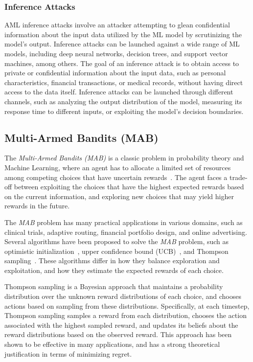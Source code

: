 \subsubsection{Inference Attacks}
AML inference attacks involve an attacker attempting to glean confidential information about the input data utilized
by the ML model by scrutinizing the model's output.
Inference attacks can be launched against a wide range of ML models, including deep neural networks, decision trees,
and support vector machines, among others.
The goal of an inference attack is to obtain access to private or confidential information about the input data, such
as personal characteristics, financial transactions, or medical records, without having direct access to the data itself.
Inference attacks can be launched through different channels, such as analyzing the output distribution of the model,
measuring its response time to different inputs, or exploiting the model's decision boundaries.


\subsection{Multi-Armed Bandits (MAB)}\label{subsec:back-multi-armed-bandit}
The \textit{Multi-Armed Bandits (MAB)} is a classic problem in probability theory and Machine Learning, where an agent
has to allocate a limited set of resources among competing choices that have uncertain
rewards~\cite{kuleshov2014algorithms}.
The agent faces a trade-off between exploiting the choices that have the highest expected rewards based on the current
information, and exploring new choices that may yield higher rewards in the future.

The \textit{MAB} problem has many practical applications in various domains, such as clinical trials, adaptive routing,
financial portfolio design, and online advertising.
Several algorithms have been proposed to solve the \textit{MAB} problem, such as optimistic
initialization~\cite{machado2014domain}, upper confidence bound (UCB)~\cite{carpentier2011upper}, and
Thompson sampling~\cite{agrawal2012analysis}.
These algorithms differ in how they balance exploration and exploitation, and how they estimate the expected rewards of
each choice.

Thompson sampling is a Bayesian approach that maintains a probability distribution over the unknown reward distributions
of each choice, and chooses actions based on sampling from these distributions.
Specifically, at each timestep, Thompson sampling samples a reward from each distribution, chooses the action associated
with the highest sampled reward, and updates its beliefs about the reward distributions based on the observed reward.
This approach has been shown to be effective in many applications, and has a strong theoretical justification in terms
of minimizing regret.

